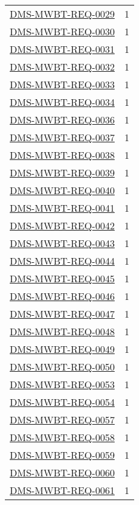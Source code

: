 \begin{small}
\begin{longtable}[]{|l|l|}
\hyperref[DMS-MWBT-REQ-0029]{DMS-MWBT-REQ-0029} & 1 \\
\hyperref[DMS-MWBT-REQ-0030]{DMS-MWBT-REQ-0030} & 1 \\
\hyperref[DMS-MWBT-REQ-0031]{DMS-MWBT-REQ-0031} & 1 \\
\hyperref[DMS-MWBT-REQ-0032]{DMS-MWBT-REQ-0032} & 1 \\
\hyperref[DMS-MWBT-REQ-0033]{DMS-MWBT-REQ-0033} & 1 \\
\hyperref[DMS-MWBT-REQ-0034]{DMS-MWBT-REQ-0034} & 1 \\
\hyperref[DMS-MWBT-REQ-0036]{DMS-MWBT-REQ-0036} & 1 \\
\hyperref[DMS-MWBT-REQ-0037]{DMS-MWBT-REQ-0037} & 1 \\
\hyperref[DMS-MWBT-REQ-0038]{DMS-MWBT-REQ-0038} & 1 \\
\hyperref[DMS-MWBT-REQ-0039]{DMS-MWBT-REQ-0039} & 1 \\
\hyperref[DMS-MWBT-REQ-0040]{DMS-MWBT-REQ-0040} & 1 \\
\hyperref[DMS-MWBT-REQ-0041]{DMS-MWBT-REQ-0041} & 1 \\
\hyperref[DMS-MWBT-REQ-0042]{DMS-MWBT-REQ-0042} & 1 \\
\hyperref[DMS-MWBT-REQ-0043]{DMS-MWBT-REQ-0043} & 1 \\
\hyperref[DMS-MWBT-REQ-0044]{DMS-MWBT-REQ-0044} & 1 \\
\hyperref[DMS-MWBT-REQ-0045]{DMS-MWBT-REQ-0045} & 1 \\
\hyperref[DMS-MWBT-REQ-0046]{DMS-MWBT-REQ-0046} & 1 \\
\hyperref[DMS-MWBT-REQ-0047]{DMS-MWBT-REQ-0047} & 1 \\
\hyperref[DMS-MWBT-REQ-0048]{DMS-MWBT-REQ-0048} & 1 \\
\hyperref[DMS-MWBT-REQ-0049]{DMS-MWBT-REQ-0049} & 1 \\
\hyperref[DMS-MWBT-REQ-0050]{DMS-MWBT-REQ-0050} & 1 \\
\hyperref[DMS-MWBT-REQ-0053]{DMS-MWBT-REQ-0053} & 1 \\
\hyperref[DMS-MWBT-REQ-0054]{DMS-MWBT-REQ-0054} & 1 \\
\hyperref[DMS-MWBT-REQ-0057]{DMS-MWBT-REQ-0057} & 1 \\
\hyperref[DMS-MWBT-REQ-0058]{DMS-MWBT-REQ-0058} & 1 \\
\hyperref[DMS-MWBT-REQ-0059]{DMS-MWBT-REQ-0059} & 1 \\
\hyperref[DMS-MWBT-REQ-0060]{DMS-MWBT-REQ-0060} & 1 \\
\hyperref[DMS-MWBT-REQ-0061]{DMS-MWBT-REQ-0061} & 1 \\

\end{longtable}
\end{small}

